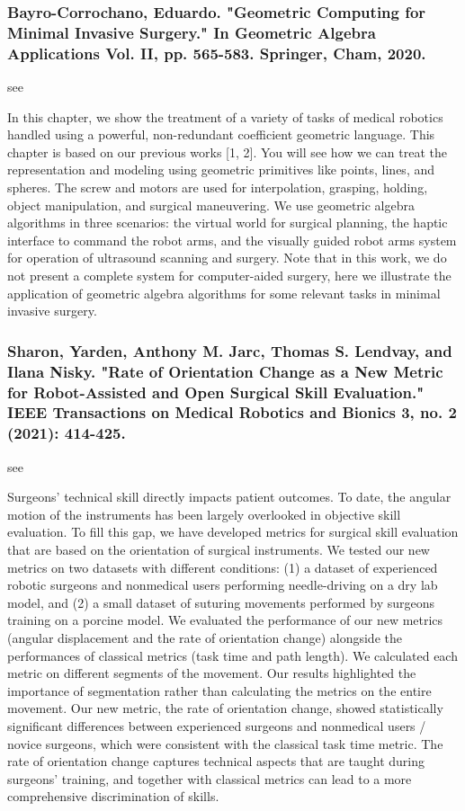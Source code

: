 \documentclass[conference]{IEEEtran}
\begin{document}
\medskip
\subsubsection{Bayro-Corrochano, Eduardo. "Geometric Computing for Minimal Invasive Surgery." In Geometric Algebra Applications Vol. II, pp. 565-583. Springer, Cham, 2020.}
see \cite{bayro2020geometric}

In this chapter, we show the treatment of a variety of tasks of medical robotics handled using a powerful, non-redundant coefficient geometric language. This chapter is based on our previous works [1, 2]. You will see how we can treat the representation and modeling using geometric primitives like points, lines, and spheres. The screw and motors are used for interpolation, grasping, holding, object manipulation, and surgical maneuvering. We use geometric algebra algorithms in three scenarios: the virtual world for surgical planning, the haptic interface to command the robot arms, and the visually guided robot arms system for operation of ultrasound scanning and surgery. Note that in this work, we do not present a complete system for computer-aided surgery, here we illustrate the application of geometric algebra algorithms for some relevant tasks in minimal invasive surgery.

\medskip
\subsubsection{Sharon, Yarden, Anthony M. Jarc, Thomas S. Lendvay, and Ilana Nisky. "Rate of Orientation Change as a New Metric for Robot-Assisted and Open Surgical Skill Evaluation." IEEE Transactions on Medical Robotics and Bionics 3, no. 2 (2021): 414-425.}
see \cite{sharon2021rate}

Surgeons’ technical skill directly impacts patient outcomes. To date, the angular motion of the instruments has been largely overlooked in objective skill evaluation. To fill this gap, we have developed metrics for surgical skill evaluation that are based on the orientation of surgical instruments. We tested our new metrics on two datasets with different conditions: (1) a dataset of experienced robotic surgeons and nonmedical users performing needle-driving on a dry lab model, and (2) a small dataset of suturing movements performed by surgeons training on a porcine model. We evaluated the performance of our new metrics (angular displacement and the rate of orientation change) alongside the performances of classical metrics (task time and path length). We calculated each metric on different segments of the movement. Our results highlighted the importance of segmentation rather than calculating the metrics on the entire movement. Our new metric, the rate of orientation change, showed statistically significant differences between experienced surgeons and nonmedical users / novice surgeons, which were consistent with the classical task time metric. The rate of orientation change captures technical aspects that are taught during surgeons’ training, and together with classical metrics can lead to a more comprehensive discrimination of skills.
\end{document}
